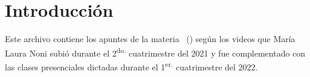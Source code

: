 \chapter{Introducción}

Este archivo contiene los apuntes de la materia \materia \, (\codigomateria)
según los videos que María Laura Noni subió durante el 2\textsuperscript{do.}
cuatrimestre del 2021 y fue complementado con las clases presenciales 
dictadas durante el 1\textsuperscript{er.} cuatrimestre del 2022.

